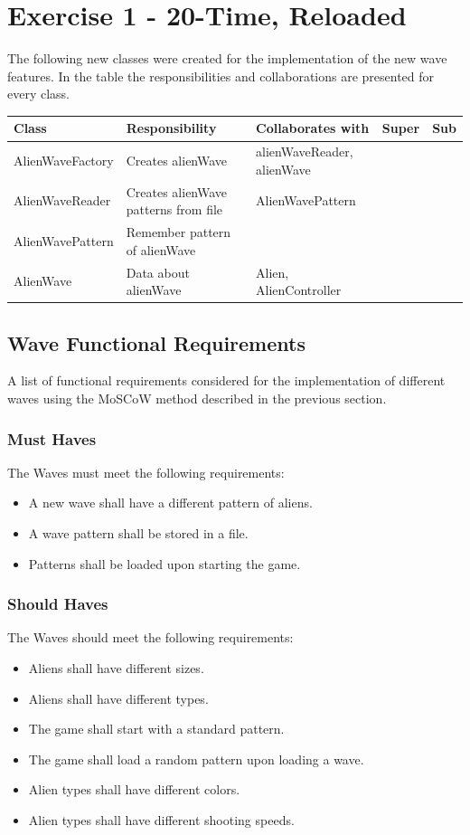 \section{Exercise 1 - 20-Time, Reloaded }
The following new classes were created for the implementation of the new wave features.
In the table the responsibilities and collaborations are presented for every class.
\begin{center}
    \begin{tabular}{ | p{3cm} | p{4cm} | p{3cm} | p{2cm} | p{3cm} |}
  \hline
    Class & Responsibility & Collaborates with & Super & Sub \\ \hline
   AlienWaveFactory &Creates alienWave & alienWaveReader, alienWave &  & \\ \hline
   AlienWaveReader & Creates alienWave patterns from file & AlienWavePattern &  & \\ \hline
   AlienWavePattern & Remember pattern of alienWave &  &  &  \\ \hline
   AlienWave &  Data about alienWave & Alien, AlienController  &  & \\ \hline

    \end{tabular}
\end{center}
\newpage
\subsection{Wave Functional Requirements}

A list of functional requirements considered for the implementation of different waves using the MoSCoW method described in the previous section.

\subsubsection{Must Haves}
The Waves must meet the following requirements:
\begin{itemize}
	\item A new wave shall have a different pattern of aliens.
	\item A wave pattern shall be stored in a file.
	\item Patterns shall be loaded upon starting the game.
\end{itemize}

\subsubsection{Should Haves}
The Waves should meet the following requirements:
\begin{itemize}
	\item Aliens shall have different sizes.
	\item Aliens shall have different types.
	\item The game shall start with a standard pattern. 
	\item The game shall load a random pattern upon loading a wave.
	\item Alien types shall have different colors.
	\item Alien types shall have different shooting speeds.
\end{itemize}

